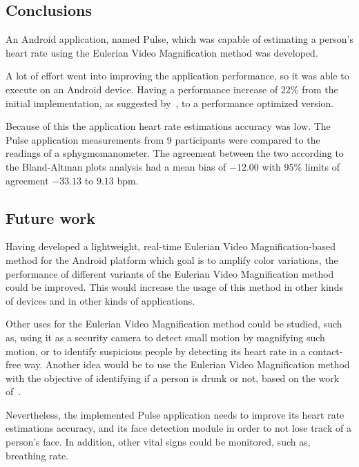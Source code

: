 \documentclass[9pt,a4paper]{extarticle}
\newcommand{\evm}{Eulerian Video Magnification}
\begin{document}
\begin{multicols}{2}
\section{Conclusions}\label{sec:conclusions}

An Android application, named Pulse, which was capable
of estimating a person's heart rate using the \evm{} method was developed.

A lot of effort went into improving the application performance,
so it was able to execute on an Android device. Having a performance
increase of 22\% from the initial implementation, as suggested
by~\cite{Wu2012Eulerian}, to a performance optimized version.

Because of this the application heart rate estimations accuracy was low.
The Pulse application measurements from 9 participants were compared
to the readings of a sphygmomanometer. The agreement between the two
according to the Bland-Altman plots analysis had a mean bias of $-12.00$ with
95\% limits of agreement $-33.13$ to $9.13$ bpm.

\subsection{Future work}\label{sec:future}

Having developed a lightweight, real-time \evm{}-based method for the
Android platform which goal is to amplify color variations, the performance
of different variants of the \evm{} method could be improved. This would
increase the usage of this method in other kinds of devices and in other
kinds of applications.

Other uses for the \evm{} method could be studied, such as, using it as a
security camera to detect small motion by magnifying such motion, or to identify
suspicious people by detecting its heart rate in a contact-free way. Another
idea would be to use the \evm{} method with the objective of identifying
if a person is drunk or not, based on the work of~\cite{Koukiou2012Drunk}.

Nevertheless, the implemented Pulse application needs to improve its heart rate
estimations accuracy, and its face detection module in order to not lose track
of a person's face. In addition, other vital signs could be monitored, such as,
breathing rate.



\end{multicols}
\end{document}
